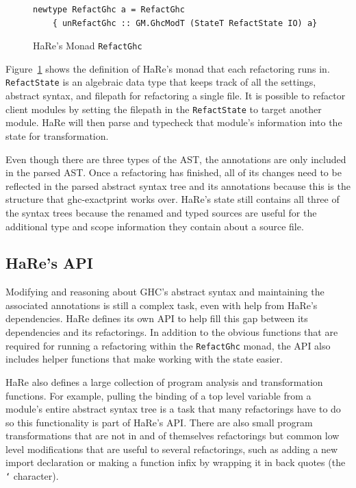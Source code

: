 \begin{figure}[t]
\begin{lstlisting}
newtype RefactGhc a = RefactGhc
    { unRefactGhc :: GM.GhcModT (StateT RefactState IO) a}
\end{lstlisting}
\caption{HaRe's Monad \texttt{RefactGhc}}
\label{refactghc}
\end{figure}

Figure~\ref{refactghc} shows the definition of HaRe's monad that each refactoring runs in. \texttt{RefactState} is an algebraic data type that keeps track of all the settings, abstract syntax, and filepath for refactoring a single file. It is possible to refactor client modules by setting the filepath in the \texttt{RefactState} to target another module. HaRe will then parse and typecheck that module's information into the state for transformation.

Even though there are three types of the AST, the annotations are only included in the parsed AST. Once a refactoring has finished, all of its changes need to be reflected in the parsed abstract syntax tree and its annotations because this is the structure that ghc-exactprint works over. HaRe's state still contains all three of the syntax trees because the renamed and typed sources are useful for the additional type and scope information they contain about a source file. 

\subsection{HaRe's API}

Modifying and reasoning about GHC's abstract syntax and maintaining the associated annotations is still a complex task, even with help from HaRe's dependencies. HaRe defines its own API to help fill this gap between its dependencies and its refactorings. In addition to the obvious functions that are required for running a refactoring within the \texttt{RefactGhc} monad, the API also includes helper functions that make working with the state easier. 

HaRe also defines a large collection of program analysis and transformation functions. For example, pulling the binding of a top level variable from a module's entire abstract syntax tree is a task that many refactorings have to do so this functionality is part of HaRe's API. There are also small program transformations that are not in and of themselves refactorings but common low level modifications that are useful to several refactorings, such as adding a new import declaration or making a function infix by wrapping it in back quotes (the \texttt{`} character).

